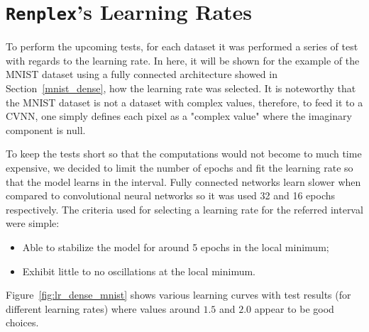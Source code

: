\section{\texttt{Renplex}'s Learning Rates}
\label{sec:lr}
To perform the upcoming tests, for each dataset it was performed a series of test with regards to the learning rate. In here, it will be shown for the example of the MNIST dataset using a fully connected architecture showed in Section~\ref{mnist_dense}, how the learning rate was selected. It is noteworthy that the MNIST dataset is not a dataset with complex values, therefore, to feed it to a \gls{CVNN}, one simply defines each pixel as a "complex value" where the imaginary component is null.

To keep the tests short so that the computations would not become to much time expensive, we decided to limit the number of epochs and fit the learning rate so that the model learns in the interval. Fully connected networks learn slower when compared to convolutional neural networks so it was used 32 and 16 epochs respectively.  The criteria used for selecting a learning rate for the referred interval were simple:

\begin{itemize}
	\item Able to stabilize the model for around 5 epochs in the local minimum;
	\item Exhibit little to no oscillations at the local minimum.
\end{itemize}

Figure~\ref{fig:lr_dense_mnist} shows various learning curves with test results (for different learning rates) where values around $ 1.5 $ and $ 2.0 $ appear to be good choices.

